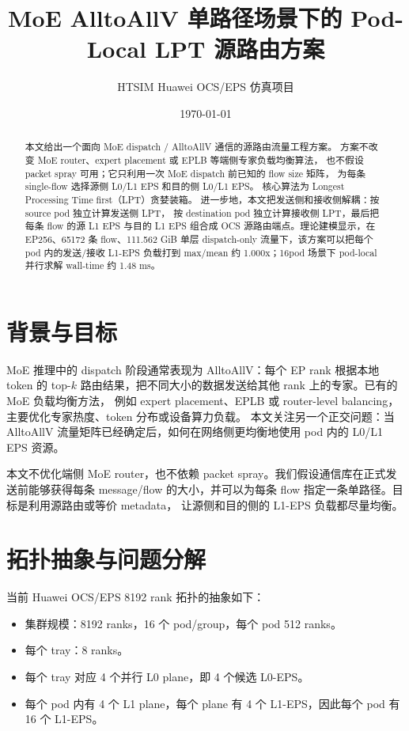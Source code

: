 \documentclass[UTF8,a4paper,11pt,fontset=none]{ctexart}
\title{\heiti MoE AlltoAllV 单路径场景下的 Pod-Local LPT 源路由方案}
\author{HTSIM Huawei OCS/EPS 仿真项目}
\date{\today}
\begin{document}
\maketitle

\begin{abstract}
本文给出一个面向 MoE dispatch / AlltoAllV 通信的源路由流量工程方案。
方案不改变 MoE router、expert placement 或 EPLB 等端侧专家负载均衡算法，
也不假设 packet spray 可用；它只利用一次 MoE dispatch 前已知的 flow size 矩阵，
为每条 single-flow 选择源侧 L0/L1 EPS 和目的侧 L0/L1 EPS。
核心算法为 Longest Processing Time first（LPT）贪婪装箱。
进一步地，本文把发送侧和接收侧解耦：按 source pod 独立计算发送侧 LPT，
按 destination pod 独立计算接收侧 LPT，最后把每条 flow 的源 L1 EPS 与目的 L1 EPS
组合成 OCS 源路由端点。理论建模显示，在 EP256、65172 条 flow、111.562 GiB 单层
dispatch-only 流量下，该方案可以把每个 pod 内的发送/接收 L1-EPS 负载打到
max/mean 约 1.000x；16pod 场景下 pod-local 并行求解 wall-time 约 1.48 ms。
\end{abstract}

\section{背景与目标}

MoE 推理中的 dispatch 阶段通常表现为 AlltoAllV：每个 EP rank 根据本地 token 的 top-$k$
路由结果，把不同大小的数据发送给其他 rank 上的专家。已有的 MoE 负载均衡方法，
例如 expert placement、EPLB 或 router-level balancing，主要优化专家热度、token 分布或设备算力负载。
本文关注另一个正交问题：当 AlltoAllV 流量矩阵已经确定后，如何在网络侧更均衡地使用
pod 内的 L0/L1 EPS 资源。

本文不优化端侧 MoE router，也不依赖 packet spray。我们假设通信库在正式发送前能够获得每条
message/flow 的大小，并可以为每条 flow 指定一条单路径。目标是利用源路由或等价 metadata，
让源侧和目的侧的 L1-EPS 负载都尽量均衡。

\section{拓扑抽象与问题分解}

当前 Huawei OCS/EPS 8192 rank 拓扑的抽象如下：

\begin{itemize}
  \item 集群规模：8192 ranks，16 个 pod/group，每个 pod 512 ranks。
  \item 每个 tray：8 ranks。
  \item 每个 tray 对应 4 个并行 L0 plane，即 4 个候选 L0-EPS。
  \item 每个 pod 内有 4 个 L1 plane，每个 plane 有 4 个 L1-EPS，因此每个 pod 有 16 个 L1-EPS。
\end{itemize}
\end{document}
